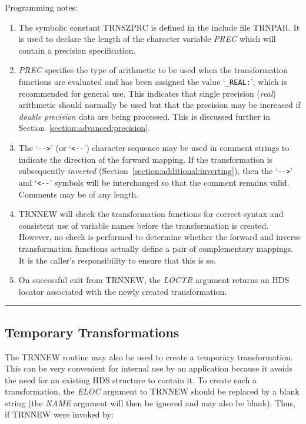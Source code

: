 \documentclass[twoside,11pt]{article}
\newcommand{\xlabel}[1]{}
\renewcommand{\_}{\texttt{\symbol{95}}}
\newcommand{\name}[1]{\mbox{\small{#1}}}
\newcommand{\fortvar}[1]{\mbox{\emph{#1}}}
\newcommand{\exampledone}[0]{\begin{center} \rule{6em}{0.2mm} \end{center}}
\begin{document}
Programming notes:

\begin{enumerate}

\item The symbolic constant \name{TRN\_\_SZPRC} is defined in the include
file \name{TRN\_PAR}.
It is used to declare the length of the character variable \fortvar{PREC}
which will contain a precision specification.

\item \fortvar{PREC} specifies the type of arithmetic to be used when the
transformation functions are evaluated and has been assigned the value
`\verb#_REAL:#', which is recommended for general use.
This indicates that single precision (\emph{real}) arithmetic should normally
be used but that the precision may be increased if \emph{double precision}
data are being processed.
This is discussed further in Section~\ref{section:advanced:precision}.

\item The `\verb#-->#' (or `\verb#<--#') character sequence may be used in
comment strings to indicate the direction of the forward mapping.
If the transformation is subsequently \emph{inverted}
(Section~\ref{section:additional:inverting}), then the `\verb#-->#' and
`\verb#<--#' symbols will be interchanged so that the comment remains valid.
Comments may be of any length.

\item \name{TRN\_NEW} will check the transformation functions for correct
syntax and consistent use of variable names before the transformation is
created.
However, no check is performed to determine whether the forward and inverse
transformation functions actually define a pair of complementary mappings.
It is the caller's responsibility to ensure that this is so.

\item On successful exit from \name{TRN\_NEW}, the \fortvar{LOCTR} argument
returns an \name{HDS} locator associated with the newly created
transformation.

\end{enumerate}
\exampledone


\subsection{\xlabel{temporary_transformations}Temporary Transformations}

\label{section:simple:temporary}

The \name{TRN\_NEW} routine may also be used to create a temporary
transformation.
This can be very convenient for internal use by an application because it
avoids the need for an existing \name{HDS} structure to contain it.
To create such a transformation, the \fortvar{ELOC} argument to
\name{TRN\_NEW} should be replaced by a blank string (the \fortvar{NAME}
argument will then be ignored and may also be blank).
Thus, if \name{TRN\_NEW} were invoked by:
\end{document}
